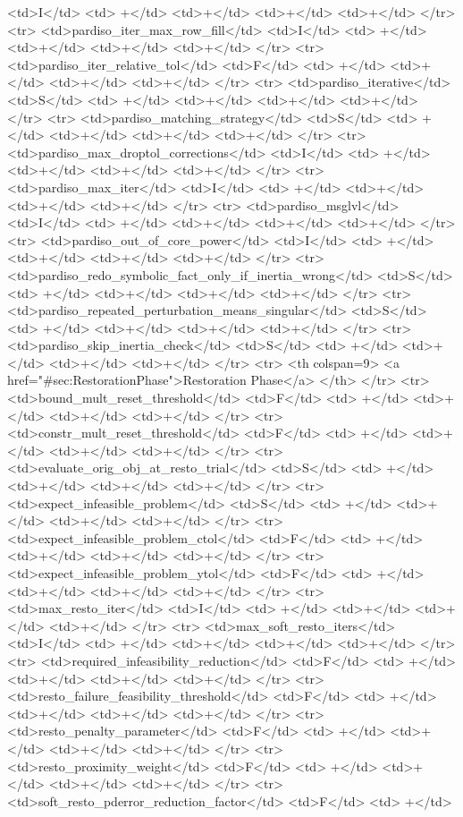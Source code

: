 {{<td>I</td>
<td> +</td>
<td>+</td>
<td>+</td>
<td>+</td>
</tr>
<tr>
<td>pardiso_iter_max_row_fill</td>
<td>I</td>
<td> +</td>
<td>+</td>
<td>+</td>
<td>+</td>
</tr>
<tr>
<td>pardiso_iter_relative_tol</td>
<td>F</td>
<td> +</td>
<td>+</td>
<td>+</td>
<td>+</td>
</tr>
<tr>
<td>pardiso_iterative</td>
<td>S</td>
<td> +</td>
<td>+</td>
<td>+</td>
<td>+</td>
</tr>
<tr>
<td>pardiso_matching_strategy</td>
<td>S</td>
<td> +</td>
<td>+</td>
<td>+</td>
<td>+</td>
</tr>
<tr>
<td>pardiso_max_droptol_corrections</td>
<td>I</td>
<td> +</td>
<td>+</td>
<td>+</td>
<td>+</td>
</tr>
<tr>
<td>pardiso_max_iter</td>
<td>I</td>
<td> +</td>
<td>+</td>
<td>+</td>
<td>+</td>
</tr>
<tr>
<td>pardiso_msglvl</td>
<td>I</td>
<td> +</td>
<td>+</td>
<td>+</td>
<td>+</td>
</tr>
<tr>
<td>pardiso_out_of_core_power</td>
<td>I</td>
<td> +</td>
<td>+</td>
<td>+</td>
<td>+</td>
</tr>
<tr>
<td>pardiso_redo_symbolic_fact_only_if_inertia_wrong</td>
<td>S</td>
<td> +</td>
<td>+</td>
<td>+</td>
<td>+</td>
</tr>
<tr>
<td>pardiso_repeated_perturbation_means_singular</td>
<td>S</td>
<td> +</td>
<td>+</td>
<td>+</td>
<td>+</td>
</tr>
<tr>
<td>pardiso_skip_inertia_check</td>
<td>S</td>
<td> +</td>
<td>+</td>
<td>+</td>
<td>+</td>
</tr>
<tr>   <th colspan=9> <a href="#sec:RestorationPhase">Restoration Phase</a> </th>
</tr>
<tr>
<td>bound_mult_reset_threshold</td>
<td>F</td>
<td> +</td>
<td>+</td>
<td>+</td>
<td>+</td>
</tr>
<tr>
<td>constr_mult_reset_threshold</td>
<td>F</td>
<td> +</td>
<td>+</td>
<td>+</td>
<td>+</td>
</tr>
<tr>
<td>evaluate_orig_obj_at_resto_trial</td>
<td>S</td>
<td> +</td>
<td>+</td>
<td>+</td>
<td>+</td>
</tr>
<tr>
<td>expect_infeasible_problem</td>
<td>S</td>
<td> +</td>
<td>+</td>
<td>+</td>
<td>+</td>
</tr>
<tr>
<td>expect_infeasible_problem_ctol</td>
<td>F</td>
<td> +</td>
<td>+</td>
<td>+</td>
<td>+</td>
</tr>
<tr>
<td>expect_infeasible_problem_ytol</td>
<td>F</td>
<td> +</td>
<td>+</td>
<td>+</td>
<td>+</td>
</tr>
<tr>
<td>max_resto_iter</td>
<td>I</td>
<td> +</td>
<td>+</td>
<td>+</td>
<td>+</td>
</tr>
<tr>
<td>max_soft_resto_iters</td>
<td>I</td>
<td> +</td>
<td>+</td>
<td>+</td>
<td>+</td>
</tr>
<tr>
<td>required_infeasibility_reduction</td>
<td>F</td>
<td> +</td>
<td>+</td>
<td>+</td>
<td>+</td>
</tr>
<tr>
<td>resto_failure_feasibility_threshold</td>
<td>F</td>
<td> +</td>
<td>+</td>
<td>+</td>
<td>+</td>
</tr>
<tr>
<td>resto_penalty_parameter</td>
<td>F</td>
<td> +</td>
<td>+</td>
<td>+</td>
<td>+</td>
</tr>
<tr>
<td>resto_proximity_weight</td>
<td>F</td>
<td> +</td>
<td>+</td>
<td>+</td>
<td>+</td>
</tr>
<tr>
<td>soft_resto_pderror_reduction_factor</td>
<td>F</td>
<td> +</td>
}}
